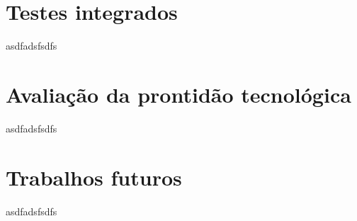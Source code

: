     
\section{Testes integrados}
\label{sec:testi}
asdfadsfsdfs

\section{Avaliação da prontidão tecnológica}
\label{sec:trl}
asdfadsfsdfs

\section{Trabalhos futuros}
\label{sec:trabfut}
asdfadsfsdfs





